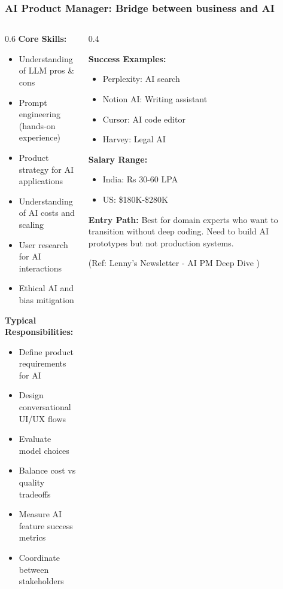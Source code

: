 \begin{frame}[fragile]\frametitle{AI Product Manager: Bridge between business and AI }


\begin{columns}
    \begin{column}[T]{0.6\linewidth}
\textbf{Core Skills:}
\begin{itemize}
\item Understanding of LLM pros \& cons
\item Prompt engineering (hands-on experience)
\item Product strategy for AI applications
\item Understanding of AI costs and scaling
\item User research for AI interactions
\item Ethical AI and bias mitigation
\end{itemize}

\textbf{Typical Responsibilities:}
\begin{itemize}
\item Define product requirements for AI
\item Design conversational UI/UX flows
\item Evaluate model choices 
\item Balance cost vs quality tradeoffs
\item Measure AI feature success metrics
\item Coordinate between stakeholders
\end{itemize}
    \end{column}
    \begin{column}[T]{0.4\linewidth}


\textbf{Success Examples:}
\begin{itemize}
\item Perplexity: AI search
\item Notion AI: Writing assistant
\item Cursor: AI code editor
\item Harvey: Legal AI
\end{itemize}

\textbf{Salary Range:}
\begin{itemize}
\item India: Rs 30-60 LPA
\item US: \$180K-\$280K
\end{itemize}

\textbf{Entry Path:}
Best for domain experts who want to transition without deep coding. Need to build AI prototypes but not production systems.

{\tiny (Ref: Lenny's Newsletter - AI PM Deep Dive )}
    \end{column}
\end{columns}


\end{frame}

